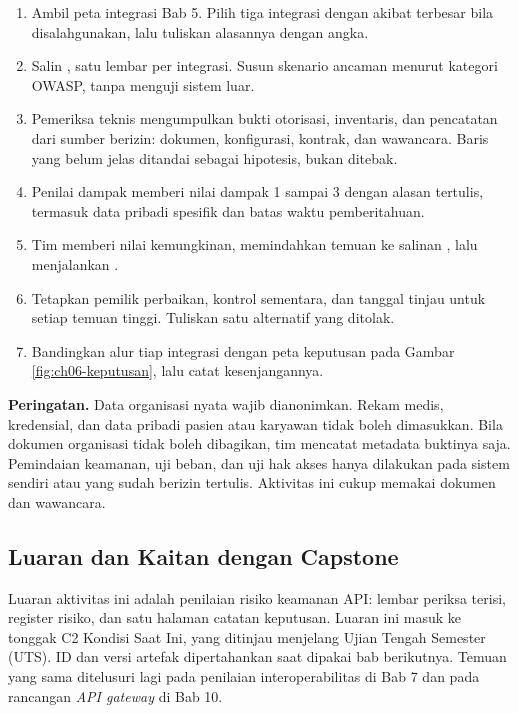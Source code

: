\begin{enumerate}
  \item Ambil peta integrasi Bab 5. Pilih tiga integrasi dengan akibat terbesar bila disalahgunakan, lalu tuliskan alasannya dengan angka.
  \item Salin , satu lembar per integrasi. Susun skenario ancaman menurut
        kategori OWASP, tanpa menguji sistem luar.
  \item Pemeriksa teknis mengumpulkan bukti otorisasi, inventaris, dan pencatatan dari sumber berizin: dokumen, konfigurasi, kontrak, dan
        wawancara. Baris yang belum jelas ditandai sebagai hipotesis, bukan ditebak.
  \item Penilai dampak memberi nilai dampak 1 sampai 3 dengan alasan tertulis, termasuk data pribadi spesifik dan batas waktu pemberitahuan.
  \item Tim memberi nilai kemungkinan, memindahkan temuan ke salinan , lalu menjalankan
        .
  \item Tetapkan pemilik perbaikan, kontrol sementara, dan tanggal tinjau untuk setiap temuan tinggi. Tuliskan satu alternatif yang ditolak.
  \item Bandingkan alur tiap integrasi dengan peta keputusan pada Gambar \ref{fig:ch06-keputusan}, lalu catat kesenjangannya.
\end{enumerate}

\textbf{Peringatan.} Data organisasi nyata wajib dianonimkan. Rekam medis, kredensial, dan data pribadi pasien atau karyawan tidak boleh
dimasukkan. Bila dokumen organisasi tidak boleh dibagikan, tim mencatat metadata buktinya saja. Pemindaian keamanan, uji beban, dan uji hak
akses hanya dilakukan pada sistem sendiri atau yang sudah berizin tertulis. Aktivitas ini cukup memakai dokumen dan wawancara.

\subsection*{Luaran dan Kaitan dengan Capstone}

Luaran aktivitas ini adalah penilaian risiko keamanan API: lembar periksa terisi, register risiko, dan satu halaman catatan keputusan. Luaran
ini masuk ke tonggak C2 Kondisi Saat Ini, yang ditinjau menjelang Ujian Tengah Semester (UTS). ID dan versi artefak dipertahankan saat dipakai
bab berikutnya. Temuan yang sama ditelusuri lagi pada penilaian interoperabilitas di Bab 7 dan pada rancangan \textit{API gateway} di Bab 10.

